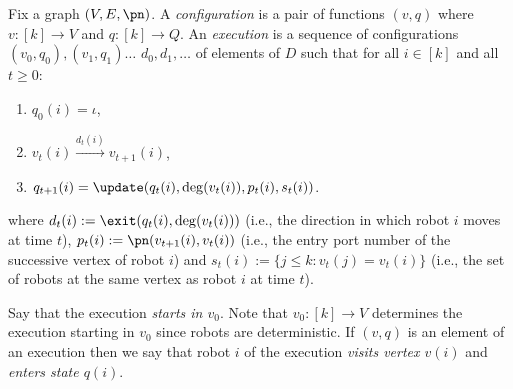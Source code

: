 Fix a graph $(V,E,\pn)$. A {\em configuration} is a pair of functions $(v,q)$
where $v : [k] \to V$ and $q : [k] \to Q$. An {\em execution} is a sequence of
configurations $(v_0, q_0), (v_1,q_1)  \dots$ %
$d_0, d_1, \dots$ of elements of $D$
such that for all $i \in [k]$ and all $t \geq 0$:
\begin{enumerate}
\item $q_{0}(i) = \iota$,
\item $v_t (i) \xrightarrow{d_t(i)} v_{t+1}(i)$,
\item $q_{t+1}(i) =  \update(q_t(i),\deg(v_t(i)),p_t(i),s_t(i))$.
\end{enumerate}
where $d_t(i) := \exit(q_t(i),\deg(v_t(i)))$ (i.e., the direction in which robot
$i$ moves at time $t$), $p_t(i) := \pn(v_{t+1}(i),v_t(i))$ (i.e., the entry port
number of the successive vertex of robot $i$) and $s_t(i) := \{j \leq k : v_t(j)
= v_t(i)\}$ (i.e., the set of robots at the same vertex as robot $i$ at time
$t$).


Say that the execution {\em starts in $v_0$}. Note that $v_0 : [k] \to V$
determines the execution starting in $v_0$ since robots are deterministic. If
$(v,q)$ is an element of an execution then we say that robot $i$ of the
execution {\em visits vertex $v(i)$} and {\em enters state $q(i)$}.









